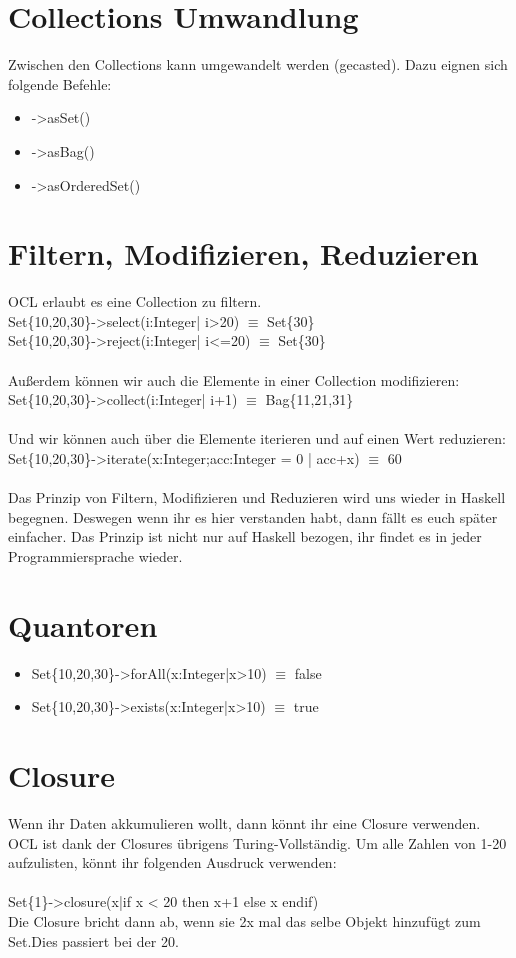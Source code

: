 \documentclass{article}
\begin{document}
\section{Collections Umwandlung}
Zwischen den Collections kann umgewandelt werden (gecasted). Dazu eignen sich folgende Befehle:
\begin{itemize}
	\item ->asSet()
	\item ->asBag()
	\item ->asOrderedSet()
\end{itemize}

\section{Filtern, Modifizieren, Reduzieren}
OCL erlaubt es eine Collection zu filtern.
\\Set\{10,20,30\}->select(i:Integer| i>20) $\equiv$ Set\{30\}
\\Set\{10,20,30\}->reject(i:Integer| i<=20) $\equiv$ Set\{30\}
\\\\Außerdem können wir auch die Elemente in einer Collection modifizieren:
\\Set\{10,20,30\}->collect(i:Integer| i+1) $\equiv$ Bag\{11,21,31\}
\\\\Und wir können auch über die Elemente iterieren und auf einen Wert reduzieren:
\\Set\{10,20,30\}->iterate(x:Integer;acc:Integer = 0 | acc+x) $\equiv$ 60
\\\\Das Prinzip von Filtern, Modifizieren und Reduzieren wird uns wieder in Haskell begegnen. Deswegen wenn ihr es hier verstanden habt, dann fällt es euch später einfacher. Das Prinzip ist nicht nur auf Haskell bezogen, ihr findet es in jeder Programmiersprache wieder.

\section{Quantoren}
\begin{itemize}
	\item Set\{10,20,30\}->forAll(x:Integer|x>10) $\equiv$ false
	\item Set\{10,20,30\}->exists(x:Integer|x>10) $\equiv$ true
\end{itemize}

\section{Closure}
Wenn ihr Daten akkumulieren wollt, dann könnt ihr eine Closure verwenden. OCL ist dank der Closures übrigens Turing-Vollständig.
Um alle Zahlen von 1-20 aufzulisten, könnt ihr folgenden Ausdruck verwenden:
\\\\Set\{1\}->closure(x|if x < 20 then x+1 else x endif)
\\Die Closure bricht dann ab, wenn sie 2x mal das selbe Objekt hinzufügt zum Set.Dies passiert bei der 20. 
\end{document}

